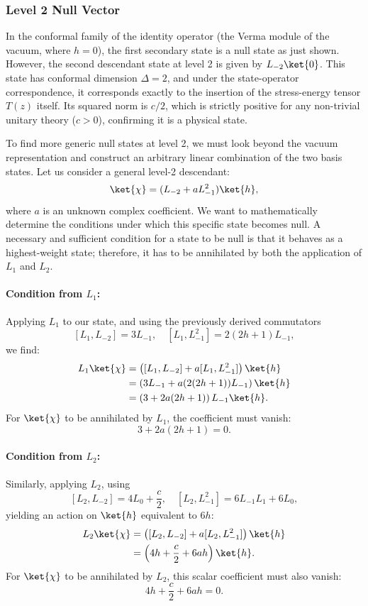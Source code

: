 \subsubsection{Level 2 Null Vector}

In the conformal family of the identity operator (the Verma module of the vacuum, where \(h=0\)), the first secondary state is a null state as just shown. However, the second descendant state at level 2 is given by \(L_{-2} \ket{0}\). This state has conformal dimension \(\Delta = 2\), and under the state-operator correspondence, it corresponds exactly to the insertion of the stress-energy tensor \(T(z)\) itself. Its squared norm is \(c/2\), which is strictly positive for any non-trivial unitary theory (\(c > 0\)), confirming it is a physical state.

To find more generic null states at level 2, we must look beyond the vacuum representation and construct an arbitrary linear combination of the two basis states. Let us consider a general level-2 descendant:
\[
    \ket{\chi} = (L_{-2} + a L_{-1}^2) \ket{h},
\]
where \(a\) is an unknown complex coefficient. We want to mathematically determine the conditions under which this specific state becomes null. A necessary and sufficient condition for a state to be null is that it behaves as a highest-weight state; therefore, it has to be annihilated by both the application of \(L_1\) and \(L_2\).

\paragraph{Condition from \(L_1\):}
Applying \(L_1\) to our state, and using the previously derived commutators
\[
    [L_1, L_{-2}] = 3L_{-1}, \quad [L_1, L_{-1}^2] = 2(2h + 1)L_{-1},
\]
we find:
\[
    \begin{aligned}
        L_1 \ket{\chi} & = \left( [L_1, L_{-2}] + a [L_1, L_{-1}^2] \right) \ket{h} \\
                       & = \left( 3L_{-1} + a(2(2h + 1))L_{-1} \right) \ket{h}      \\
                       & = \left( 3 + 2a(2h + 1) \right) L_{-1} \ket{h}.
    \end{aligned}
\]
For \(\ket{\chi}\) to be annihilated by \(L_1\), the coefficient must vanish:
\[
    3 + 2a(2h + 1) = 0.
\]

\paragraph{Condition from \(L_2\):}
Similarly, applying \(L_2\), using
\[
    [L_2, L_{-2}] = 4L_0 + \frac{c}{2}, \quad [L_2, L_{-1}^2] = 6L_{-1}L_1 + 6L_0,
\]
yielding an action on \(\ket{h}\) equivalent to \(6h\):
\[
    \begin{aligned}
        L_2 \ket{\chi} & = \left( [L_2, L_{-2}] + a [L_2, L_{-1}^2] \right) \ket{h} \\
                       & = \left( 4h + \frac{c}{2} + 6ah \right) \ket{h}.
    \end{aligned}
\]
For \(\ket{\chi}\) to be annihilated by \(L_2\), this scalar coefficient must also vanish:
\[
    4h + \frac{c}{2} + 6ah = 0.
\]


